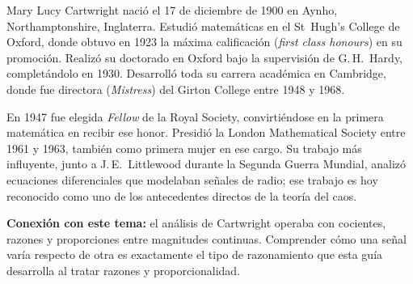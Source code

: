 \documentclass[11pt, letterpaper]{article}
\begin{document}
\begin{tcolorbox}[enhanced, breakable, colback=white, colframe=blockb,
  colbacktitle=blockb, coltitle=white, arc=4pt, leftrule=5pt,
  left=10pt, right=10pt, top=12pt, bottom=10pt, fonttitle=\bfseries,
  attach boxed title to top left={xshift=0.5cm, yshift*=-\tcboxedtitleheight/2},
  boxed title style={colframe=blockb, colback=blockb, arc=2pt},
  title={Mary Cartwright \hfill \normalfont\itshape 1900--1998 $\cdot$ Inglaterra}]

\begin{minipage}[t]{0.18\linewidth}
\vspace{0pt}
\end{minipage}
\hfill
\begin{minipage}[t]{0.78\linewidth}
\vspace{0pt}

Mary Lucy Cartwright naci\'o el 17 de diciembre de 1900 en Aynho, Northamptonshire, Inglaterra. Estudi\'o matem\'aticas en el St~Hugh's College de Oxford, donde obtuvo en 1923 la m\'axima calificaci\'on (\textit{first class honours}) en su promoci\'on. Realiz\'o su doctorado en Oxford bajo la supervisi\'on de G.\,H.~Hardy, complet\'andolo en 1930. Desarroll\'o toda su carrera acad\'emica en Cambridge, donde fue directora (\textit{Mistress}) del Girton College entre 1948 y 1968.

\medskip
En 1947 fue elegida \textit{Fellow} de la Royal Society, convirti\'endose en la primera matem\'atica en recibir ese honor. Presidi\'o la London Mathematical Society entre 1961 y 1963, tambi\'en como primera mujer en ese cargo. Su trabajo m\'as influyente, junto a J.\,E.~Littlewood durante la Segunda Guerra Mundial, analiz\'o ecuaciones diferenciales que modelaban se\~nales de radio; ese trabajo es hoy reconocido como uno de los antecedentes directos de la teor\'ia del caos.

\medskip
\textbf{Conexi\'on con este tema:} el an\'alisis de Cartwright operaba con cocientes, razones y proporciones entre magnitudes continuas. Comprender c\'omo una se\~nal var\'ia respecto de otra es exactamente el tipo de razonamiento que esta gu\'ia desarrolla al tratar razones y proporcionalidad.
\end{minipage}

\end{tcolorbox}
\end{document}
